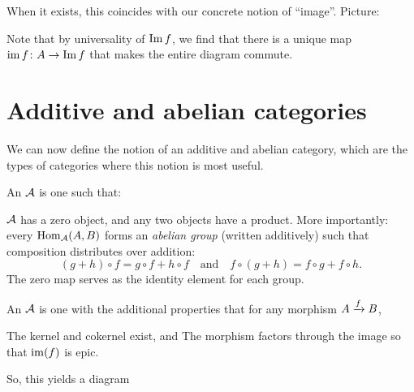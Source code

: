 When it exists, this coincides with our concrete notion of ``image''.
Picture:
\begin{center}
\end{center}
Note that by universality of $\Img f$,
we find that there is a unique map
$\img f \colon A \to \Img f$ that makes the entire diagram commute.

\section{Additive and abelian categories}
We can now define the notion of an additive and abelian category,
which are the types of categories where this notion is most useful.

\begin{definition}
	An  $\AA$ is one such that:
	\begin{itemize}
		\ii $\AA$ has a zero object, and any two objects have a product.
		\ii More importantly: every $\Hom_\AA(A, B)$ forms an \emph{abelian group} (written additively)
		such that composition distributes over addition:
		\[ (g+h)\circ f = g\circ f + h\circ f
			\quad\text{and}\quad
			f\circ(g+h) = f\circ g + f \circ h. \]
		The zero map serves as the identity element for each group.
\end{itemize}
\end{definition}
\begin{definition}
	An  $\AA$ is one with the additional properties that
	for any morphism $A \taking f B$,
	\begin{itemize}
		\ii The kernel and cokernel exist, and
		\ii The morphism factors through the image so that $\img(f)$ is epic.
	\end{itemize}
	So, this yields a diagram
	\begin{center}
	\end{center}
\end{definition}

